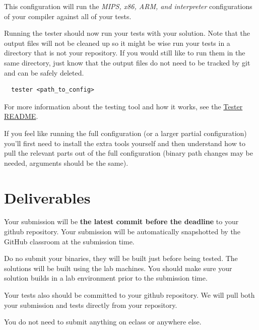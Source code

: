 \documentclass{article}
\begin{document}
This configuration will run the \textit{MIPS, x86, ARM, and interpreter} configurations of your
compiler against all of your tests.

Running the tester should now run your tests with your solution. Note that the output files will
not be cleaned up so it might be wise run your tests in a directory that is not your repository. If
you would still like to run them in the same directory, just know that the output files do not need
to be tracked by git and can be safely deleted.
\begin{lstlisting}
  tester <path_to_config>
\end{lstlisting}

For more information about the testing tool and how it works, see the
\href{https://github.com/cmput415/Tester/blob/master/README.md}{Tester README}.

If you feel like running the full configuration (or a larger partial configuration) you'll first
need to install the extra tools yourself and then understand how to pull the relevant parts out of
the full configuration (binary path changes may be needed, arguments should be the same).

\section{Deliverables}
Your submission will be \textbf{the latest commit before the deadline} to your github repository.
Your submission will be automatically snapshotted by the GitHub classroom at the submission time.

Do no submit your binaries, they will be built just before being tested. The solutions will be
built using the lab machines. You should make sure your solution builds in a lab environment prior
to the submission time.

Your tests also should be committed to your github repository. We will pull both your submission
and tests directly from your repository.

You do not need to submit anything on eclass or anywhere else.
\end{document}
